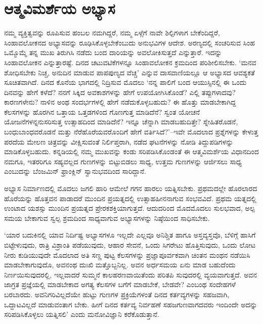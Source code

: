 \section*{ಆತ್ಮವಿಮರ್ಶೆಯ ಅಭ್ಯಾಸ}


ನಮ್ಮ ವ್ಯಕ್ತಿತ್ವವನ್ನು ರೂಪಿಸುವ ಹಂಬಲ ನಮಗಿದ್ದರೆ, ನಮ್ಮ ಏಳ್ಗೆಗೆ ನಾವೇ ಶಿಲ್ಪಿಗಳಾಗ ಬೇಕೆಂದಿದ್ದರೆ, ಸಿಂಹಾವಲೋಕನದ ಅಭ್ಯಾಸವನ್ನು ರೂಢಿಸಿಕೊಳ್ಳಬೇಕೆಂಬುದು ಅನುಭವಿಗಳ ಆದೇಶ. ಅರಣ್ಯದಲ್ಲಿ ಸಂಚರಿಸುವ ಸಿಂಹ ಒಮ್ಮೊಮ್ಮೆ ತನ್ನ ಮುಖ ತಿರುಗಿಸಿ ನಡೆದು ಬಂದ ದಾರಿಯನ್ನು ಅವಲೋಕಿಸುತ್ತದೆ ಎನ್ನುತ್ತಾರೆ. ಇದನ್ನು ಸಿಂಹಾವಲೋಕನ ಎನ್ನುತ್ತಾರಷ್ಟೆ. ದಿನದ ಚಟುವಟಿಕೆಗಳನ್ನೂ ಸಿಂಹಾವಲೋಕನ ಕ್ರಮದಿಂದ ಪರಿಶೀಲಿಸಬೇಕು. ‘ಮನವ ಶೋಧಿಸಬೇಕು ನಿಚ್ಚ, ಅನುದಿನ ಮಾಡುವ ಪಾಪಪುಣ್ಯದ ವೆಚ್ಚ’ ಎನ್ನುವ ದಾಸವಾಣಿಯಲ್ಲೂ ಆ ಅಭ್ಯಾಸದ ಆವಶ್ಯಕತೆ ಸೂಚಿತವಾಗಿದೆ. ದಿನದ ಕೊನೆಯ ಭಾಗದಲ್ಲಿ ನಿದ್ರಿಸುವ ಮೊದಲು ‘ನನ್ನ ಪಾಲಿಗೆ ಬಂದ ಆಯುಸ್ಸಿನಲ್ಲಿ ಈ ಒಂದು ದಿನವನ್ನು ಹೇಗೆ ಕಳೆದೆ? ನನಗೆ ಸಿಕ್ಕಿದ ಅವಕಾಶಗಳನ್ನು ಹೇಗೆ ಉಪಯೋಗಿಸಿಕೊಂಡೆ? ಎಲ್ಲಿ ತಪ್ಪುಗಳಾದವು? ಕಾರಣಗಳೇನು? ನಾಳಿನ ಅಂಥ ಸಂದರ್ಭಗಳಲ್ಲಿ ಹೇಗೆ ನಡೆದುಕೊಳ್ಳಬಹುದು? ಈ ಹೊತ್ತು ಮಾಡಬೇಕಾಗಿದ್ದ ಕೆಲಸಗಳನ್ನು ಹೊರಗಿನ ಒತ್ತಾಯ ಒತ್ತಡಗಳಿಂದ ಗೊಣಗುತ್ತ ಮಾಡಿದೆನೆ? ಸ್ವಂತ ಯೋಚನೆ ಯೋಜನೆಗಳನ್ನನು\-ಸರಿಸುತ್ತ ಉತ್ಸಾಹದಿಂದ ಮಾಡಿದೆನೆ? ಇನ್ನೂ ಚೆನ್ನಾಗಿ ಮಾಡಬಹುದಿತ್ತೇ? ಸ್ನೇಹಿತರೊಡನೆ, ಬಂಧುಬಾಂಧವರೊಡನೆ ಮತ್ತು ನೆರೆಹೊರೆಯವರೊಂದಿಗೆ ಹೇಗೆ ವರ್ತಿಸಿದೆ?’–ಇವೇ ಮೊದಲಾದ ಪ್ರಶ್ನೆಗಳನ್ನು ಕೇಳುತ್ತ ಪರದೆಯ ಮೇಲಣ ಚಿತ್ರವನ್ನು ವೀಕ್ಷಿಸುವಂತೆ ನಿರ್ಲಿಪ್ತ\-ರಾಗಿ, ನಡೆದ ಘಟನೆಗಳನ್ನು ನೋಡಿ ತಿದ್ದುಪಡಿಗಳನ್ನು ಮಾಡಿಕೊಳ್ಳಬಹುದು. ಕನ್ನಡಿಯಲ್ಲಿ ನಮ್ಮ ಮುಖವನ್ನು ಕಂಡು ಸರಿಪಡಿಸಿಕೊಂಡಂತೆ ಈ ಆತ್ಮವಿಮರ್ಶೆಯ ವಿಧಾನದಿಂದ ನಮಗೂ, ಇತರರಿಗೂ ಸಹ್ಯವಲ್ಲದ ಗುಣಗಳನ್ನು ಬಿಟ್ಟುಬಿಡಲು ಸಾಧ್ಯ, ಉತ್ತಮ ಗುಣಗಳನ್ನು ಆರ್ಜಿಸಲು ಸಾಧ್ಯ ಎಂಬುದನ್ನು ಬೆಂಜಮಿನ್ ಫ್ರಾಂಕ್ಲಿನ್ ಸ್ವಾನುಭವದಿಂದ ಸಾರಿದ್ದಾನೆ.

ಅಭ್ಯಾಸ ನಿರ್ಮಾಣದಲ್ಲಿ ಮೊದಲು ಜಗಲಿ ಹಾರಿ ಆಮೇಲೆ ಗಗನ ಹಾರಲು ಯತ್ನಿಸಬೇಕು. ಪ್ರಥಮದಲ್ಲೇ ಹೊರಲಾರದ ಹೊರೆಯನ್ನು ಹೊತ್ತವನ ಪಾಡಾದರೆ ಮುಂದಿನ ಪ್ರಯತ್ನದಲ್ಲಿ ಉತ್ಸಾಹಹೀನನಾಗುವ ಸಂಭವವಿದೆ. ಪ್ರಥಮ ಯತ್ನದಲ್ಲಿ ಉಂಟಾದ ಯಶಸ್ಸು ಮುಂದಿನ ಪ್ರಯತ್ನದ ಪ್ರೇರಕಶಕ್ತಿಯಾಗುತ್ತದೆ. ಆದುದರಿಂದ ಮೊದಮೊದಲು ಸುಲಭವಾದ, ಅಲ್ಪ ಸಮಯ ಬೇಕಾಗುವ ಸ್ವಲ್ಪ ಶ್ರಮದಿಂದ ಸಾಧ್ಯವಾಗುವ ಅಭ್ಯಾಸಗಳನ್ನು ನಿಷ್ಠೆಯಿಂದ ಸಾಧಿಸಬೇಕು.

‘ಯಾರ ಬದುಕಿನಲ್ಲಿ ಯಾವ ನಿರ್ದಿಷ್ಟ ಅಭ್ಯಾಸಗಳೂ ಇಲ್ಲದೇ ಎಲ್ಲವೂ ಅನಿಶ್ಚಿತ ಹಾಗೂ ಅಸ್ತವ್ಯಸ್ತವೊ, ಬೆಳಿಗ್ಗೆ ಹಾಸಿಗೆ ಬಿಟ್ಟೇಳುವುದು, ರಾತ್ರಿ ವಿಶ್ರಾಂತಿ ಪಡೆಯುವುದು, ಆಹಾರ ಸೇವನೆ, ಒಂದು ಸಿಗರೇಟು ಹೊತ್ತಿಸುವುದು, ಒಂದು ಲೋಟ ನೀರು ಕುಡಿಯುವುದೇ ಮೊದಲಾದ ಅತಿ ಸಣ್ಣ ಪುಟ್ಟ ಕೆಲಸಗಳನ್ನು ಪ್ರಜ್ಞಾಪೂರ್ವಕವಾಗಿ ಚಿಂತನ ಮಂಥನ ನಡೆಯಿಸಿ ಮಾಡ\-ಬೇಕಾ\-ಗುವುದೊ, ಅವನಂಥ ದುಃಖಿ ಮತ್ತೊಬ್ಬನಿಲ್ಲ. ಅವನ ಅರ್ಧಸಮಯ ಏನು ಮಾಡ ಬಹುದೆಂದು ನಿರ್ಣಯಿಸುವುದರಲ್ಲಿ, ಇಲ್ಲವಾದರೆ ಸುಮ್ಮನೆ ಕಾಲಹರಣವಾಯಿತೆಂದು ಪರಿತಪಿ ಸುವುದರಲ್ಲಿ ವ್ಯಯವಾಗುತ್ತದೆ. ಅವನ ಜಾಗ್ರತ ಪ್ರಜ್ಞೆಯಲ್ಲಿ ಮಾಡಬೇಕಾದ ಅಗತ್ಯ ಕೆಲಸಗಳ ಬಗೆಗೆ ಮಾಡಬೇಕೆ, ಬೇಡವೇ? ಎಂಬಂಥ ಸಂದೇಹಗಳೆ ಬರಬಾರದು. ಅವನಿಗರಿವಿಲ್ಲದೆಯೇ ಹುಟ್ಟು ಗುಣಗಳ ಪ್ರಕ್ರಿಯೆಗಳಂತೆ ದಿನದ ಕರ್ತವ್ಯಗಳನ್ನು ಸಹಜವಾಗಿ, ಒದ್ದಾಟವಿಲ್ಲದೆ ಮಾಡುವಂತಾಗ ಬೇಕು. ಹೀಗೆ ದಿನದ ಕರ್ತವ್ಯ ನಿರ್ವಹಣೆ ಸಹಜಗುಣವಾಗದವರು ಇಂದಿಂದೇ ಅದನ್ನು ಸರಿಪಡಿಸಿಕೊಳ್ಳಲು ಯತ್ನಿಸಲಿ’ ಎಂದು ಮನೋವಿಜ್ಞಾನಿ ಕರೆಕೊಡುತ್ತಾನೆ.


